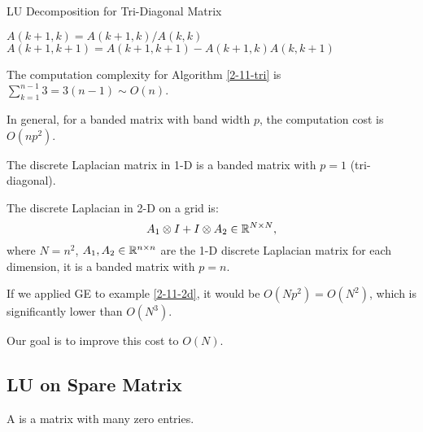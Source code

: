 \documentclass[../main/main.tex]{subfiles}
\begin{document}
        	\begin{algorithm}[h!]
	\caption{LU Decomposition for Tri-Diagonal Matrix}
    \label{2-11-tri}
	\begin{algorithmic}[1]
      \State $A(k+1,k) = A(k+1,k) / A(k, k)$
      \State $A(k+1,k+1)= A(k+1,k+1) - A(k+1,k) A(k,k+1)$
      \EndFor
	\end{algorithmic}
	\end{algorithm}
    \begin{theorem}
      The computation complexity for Algorithm \ref{2-11-tri} is $\sum_{k=1}^{n-1} 3 = 3(n-1)\sim O(n)$.
    \end{theorem}
    \begin{theorem}
In general, for a banded matrix with band width $p$, the computation cost is $O(np^2)$.
    \end{theorem}
    \begin{example}
The discrete Laplacian matrix in 1-D is a banded matrix with $p=1$ (tri-diagonal).
    \end{example}
\begin{example}
  \label{2-11-2d}
  The discrete Laplacian in 2-D on a grid is: \[
    A_1 \otimes I + I \otimes A_{2} \in\mathbb{R}^{N \times N},
  \] where $N = n^2$, $A_{1},A_{2}\in\mathbb{R}^{n \times n}$ are the 1-D discrete Laplacian matrix for each dimension, it is a banded matrix with $p=n$.
\end{example}
\begin{remark}
If we applied GE to example \ref{2-11-2d}, it would be $O(Np^2) = O(N^2)$, which is significantly lower than $O(N^3)$.
\end{remark}
Our goal is to improve this cost to $O(N)$.
\subsection{LU on Spare Matrix}
\begin{definition}
  A  is a matrix with many zero entries.
\end{definition}
\end{document}
